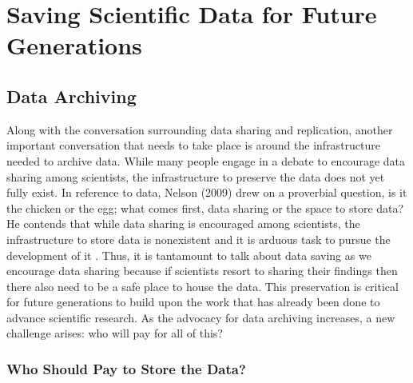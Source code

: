 \documentclass[sigconf]{acmart}
\begin{document}
\section{Saving Scientific Data for Future Generations}


\subsection{Data Archiving}

Along with the conversation surrounding data sharing and replication, another important conversation that needs to take place is around the infrastructure needed to archive data. While many people engage in a debate to encourage data sharing among scientists, the infrastructure to preserve the data does not yet fully exist. In reference to data, Nelson (2009) drew on a proverbial question, is it the chicken or the egg; what comes first, data sharing or the space to store data? He contends that while data sharing is encouraged among scientists, the infrastructure to store data is nonexistent and it is arduous task to pursue the development of it \cite{nelson2009empty}. Thus, it is tantamount to talk about data saving as we encourage data sharing because if scientists resort to sharing their findings then there also need to be a safe place to house the data. This preservation is critical for future generations to build upon the work that has already been done to advance scientific research. As the advocacy for data archiving increases, a new challenge arises: who will pay for all of this?

\subsubsection{Who Should Pay to Store the Data?}
\end{document}
